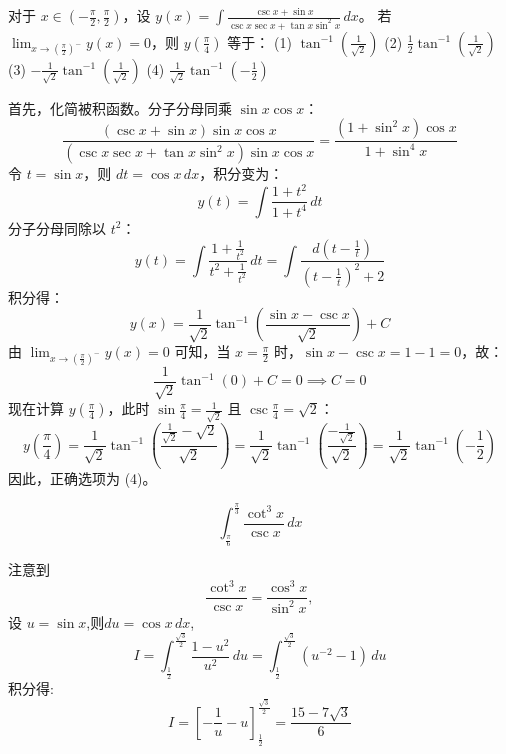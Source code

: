 \begin{questions}
    \question
对于 $x \in \left( -\frac{\pi}{2}, \frac{\pi}{2} \right)$，设 $y(x) = \int \frac{\csc x + \sin x}{\csc x \sec x + \tan x \sin^2 x} \, dx$。
若 $\lim_{x \to \left( \frac{\pi}{2} \right)^-} y(x) = 0$，则 $y \left( \frac{\pi}{4} \right)$ 等于：
(1) $\tan^{-1} \left( \frac{1}{\sqrt{2}} \right)$ \quad (2) $\frac{1}{2} \tan^{-1} \left( \frac{1}{\sqrt{2}} \right)$ \quad 
(3) $-\frac{1}{\sqrt{2}} \tan^{-1} \left( \frac{1}{\sqrt{2}} \right)$ \quad (4) $\frac{1}{\sqrt{2}} \tan^{-1} \left( -\frac{1}{2} \right)$

\begin{solution}
首先，化简被积函数。分子分母同乘 $\sin x \cos x$：
\[
\frac{(\csc x + \sin x) \sin x \cos x}{(\csc x \sec x + \tan x \sin^2 x) \sin x \cos x} = \frac{(1 + \sin^2 x) \cos x}{1 + \sin^4 x}
\]
令 $t = \sin x$，则 $dt = \cos x \, dx$，积分变为：
\[
y(t) = \int \frac{1 + t^2}{1 + t^4} \, dt
\]
分子分母同除以 $t^2$：
\[
y(t) = \int \frac{1 + \frac{1}{t^2}}{t^2 + \frac{1}{t^2}} \, dt = \int \frac{d\left( t - \frac{1}{t} \right)}{\left( t - \frac{1}{t} \right)^2 + 2}
\]
积分得：
\[
y(x) = \frac{1}{\sqrt{2}} \tan^{-1} \left( \frac{\sin x - \csc x}{\sqrt{2}} \right) + C
\]
由 $\lim_{x \to \left( \frac{\pi}{2} \right)^-} y(x) = 0$ 可知，当 $x = \frac{\pi}{2}$ 时，$\sin x - \csc x = 1 - 1 = 0$，故：
\[
\frac{1}{\sqrt{2}} \tan^{-1}(0) + C = 0 \implies C = 0
\]
现在计算 $y \left( \frac{\pi}{4} \right)$，此时 $\sin \frac{\pi}{4} = \frac{1}{\sqrt{2}}$ 且 $\csc \frac{\pi}{4} = \sqrt{2}$：
\[
y \left( \frac{\pi}{4} \right) = \frac{1}{\sqrt{2}} \tan^{-1} \left( \frac{\frac{1}{\sqrt{2}} - \sqrt{2}}{\sqrt{2}} \right) = \frac{1}{\sqrt{2}} \tan^{-1} \left( \frac{-\frac{1}{\sqrt{2}}}{\sqrt{2}} \right) = \frac{1}{\sqrt{2}} \tan^{-1} \left( -\frac{1}{2} \right)
\]
因此，正确选项为 (4)。
\end{solution}

    \question
    \[
    \int_{\frac{\pi}{6}}^{\frac{\pi}{3}} \frac{\cot^3 x}{\csc x} \, dx
    \]
    \begin{solution}
        注意到 
        \[
        \frac{\cot^3 x}{\csc x} = \frac{\cos^3 x}{\sin^2 x},
        \]
        设 $u = \sin x$,则$du=\cos x \, dx$,
        \[
        I = \int_{\frac{1}{2}}^{\frac{\sqrt{3}}{2}} \frac{1-u^2}{u^2} \, du = \int_{\frac{1}{2}}^{\frac{\sqrt{3}}{2}} (u^{-2} - 1) \, du
        \]
        积分得:
        \[
        I = \left[ -\frac{1}{u} - u \right]_{\frac{1}{2}}^{\frac{\sqrt{3}}{2}} = \frac{15 - 7\sqrt{3}}{6}
        \]
    \end{solution}


\end{questions}
